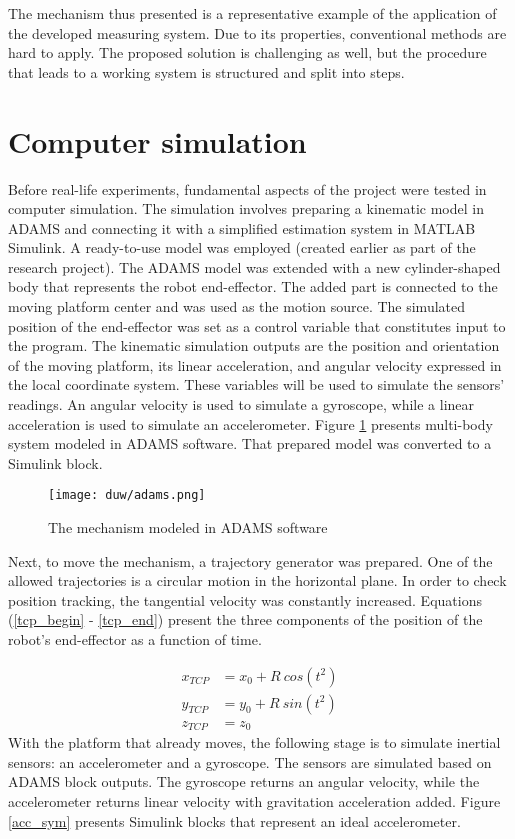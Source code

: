 The mechanism thus presented is a representative example of the application of the developed measuring system. Due to its properties, conventional methods are hard to apply. The proposed solution is challenging as well, but the procedure that leads to a working system is structured and split into steps. 

\section{Computer simulation}

Before real-life experiments, fundamental aspects of the project were tested in computer simulation. The simulation involves preparing a kinematic model in ADAMS and connecting it with a simplified estimation system in MATLAB Simulink. A ready-to-use model was employed (created earlier as part of the research project). The ADAMS model was extended with a new cylinder-shaped body that represents the robot end-effector. The added part is connected to the moving platform center and was used as the motion source. The simulated position of the end-effector was set as a control variable that constitutes input to the program. The kinematic simulation outputs are the position and orientation of the moving platform, its linear acceleration, and angular velocity expressed in the local coordinate system. These variables will be used to simulate the sensors' readings. An angular velocity is used to simulate a gyroscope, while a linear acceleration is used to simulate an accelerometer. Figure \ref{adams} presents multi-body system modeled in ADAMS software. That prepared model was converted to a Simulink block.

\begin{figure}[!h]
	\centering
	\texttt{[image: duw/adams.png]}
	\caption{The mechanism modeled in ADAMS software}
	\label{adams}
\end{figure}

Next, to move the mechanism, a trajectory generator was prepared. One of the allowed trajectories is a circular motion in the horizontal plane. In order to check position tracking, the tangential velocity was constantly increased. Equations (\ref{tcp_begin} - \ref{tcp_end}) present the three components of the position of the robot's end-effector as a function of time.

\begin{align}
	x_{TCP} &= x_0 +  R\ cos( t^2 )
	\label{tcp_begin}\\
	y_{TCP} &= y_0  + R\ sin( t^2 )\\
	z_{TCP} &= z_0
	\label{tcp_end}
\end{align}
\newpage
With the platform that already moves, the following stage is to simulate inertial sensors: an accelerometer and a gyroscope. The sensors are simulated based on ADAMS block outputs. The gyroscope returns an angular velocity, while the accelerometer returns linear velocity with gravitation acceleration added. Figure \ref{acc_sym} presents Simulink blocks that represent an ideal accelerometer.

